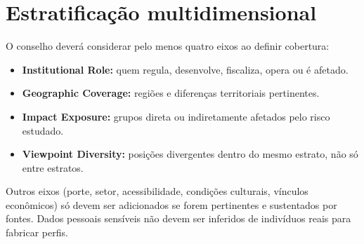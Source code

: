 \documentclass[12pt,a4paper,oneside,english,brazil]{abntex2}
\begin{document}
\section{Estratificação multidimensional}
O conselho deverá considerar pelo menos quatro eixos ao definir cobertura:\par
\begin{itemize}
\item \textbf{Institutional Role:} quem regula, desenvolve, fiscaliza, opera ou é afetado.
\item \textbf{Geographic Coverage:} regiões e diferenças territoriais pertinentes.
\item \textbf{Impact Exposure:} grupos direta ou indiretamente afetados pelo risco estudado.
\item \textbf{Viewpoint Diversity:} posições divergentes dentro do mesmo estrato, não só entre estratos.
\end{itemize}
Outros eixos (porte, setor, acessibilidade, condições culturais, vínculos econômicos) só devem ser adicionados se forem pertinentes e sustentados por fontes. Dados pessoais sensíveis não devem ser inferidos de indivíduos reais para fabricar perfis.
\end{document}
